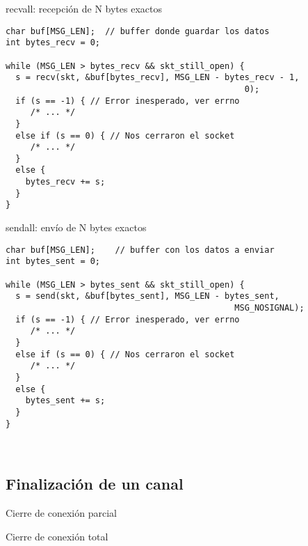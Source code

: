 \begin{frame}[fragile]{recvall: recepci\'on de N bytes exactos}
      \begin{lstlisting}[style=normal]
char buf[MSG_LEN];  // buffer donde guardar los datos
int bytes_recv = 0;

while (MSG_LEN > bytes_recv && skt_still_open) {
  s = recv(skt, &buf[bytes_recv], MSG_LEN - bytes_recv - 1,
                                                0);
  if (s == -1) { // Error inesperado, ver errno
     /* ... */
  }
  else if (s == 0) { // Nos cerraron el socket
     /* ... */
  }
  else {
    bytes_recv += s;
  }
}
      \end{lstlisting}
\end{frame}
\begin{frame}[fragile]{sendall: env\'io de N bytes exactos}
      \begin{lstlisting}[style=normal]
char buf[MSG_LEN];    // buffer con los datos a enviar
int bytes_sent = 0;

while (MSG_LEN > bytes_sent && skt_still_open) {
  s = send(skt, &buf[bytes_sent], MSG_LEN - bytes_sent,
                                              MSG_NOSIGNAL);
  if (s == -1) { // Error inesperado, ver errno
     /* ... */
  }
  else if (s == 0) { // Nos cerraron el socket
     /* ... */
  }
  else {
    bytes_sent += s;
  }
}
      \end{lstlisting}
\end{frame}

~%
\subsection{Finalizaci\'on de un canal}
\begin{frame}{Cierre de conexi\'on parcial}
\end{frame}

\begin{frame}{Cierre de conexi\'on total}
\end{frame}

